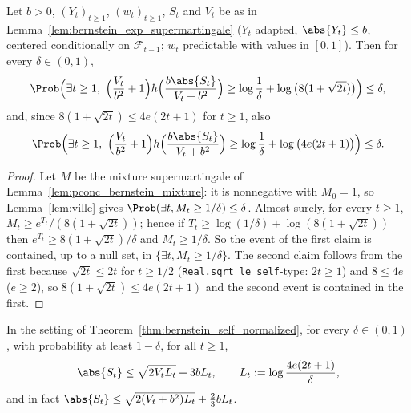 \begin{theorem}\label{thm:bernstein_self_normalized}
\leanok
Let $b > 0$, $(Y_t)_{t \ge 1}$, $(w_t)_{t \ge 1}$, $S_t$ and $V_t$ be as in
Lemma~\ref{lem:bernstein_exp_supermartingale} ($Y_t$ adapted, $\abs{Y_t} \le b$, centered
conditionally on $\mathcal F_{t-1}$; $w_t$ predictable with values in $[0, 1]$). Then for every
$\delta \in (0, 1)$,
\[
  \Prob\Big( \exists t \ge 1,\ \Big(\frac{V_t}{b^2} + 1\Big) h\Big(\frac{b\abs{S_t}}{V_t + b^2}\Big) \ge \log\frac1\delta + \log\big(8(1 + \sqrt{2t})\big) \Big) \le \delta ,
\]
and, since $8(1 + \sqrt{2t}) \le 4e(2t + 1)$ for $t \ge 1$, also
\[
  \Prob\Big( \exists t \ge 1,\ \Big(\frac{V_t}{b^2} + 1\Big) h\Big(\frac{b\abs{S_t}}{V_t + b^2}\Big) \ge \log\frac1\delta + \log\big(4e(2t + 1)\big) \Big) \le \delta .
\]
\end{theorem}

\begin{proof}
\leanok
Let $M$ be the mixture supermartingale of Lemma~\ref{lem:pconc_bernstein_mixture}: it is
nonnegative with $M_0 = 1$, so Lemma~\ref{lem:ville} gives $\Prob(\exists t, M_t \ge 1/\delta) \le \delta$.
Almost surely, for every $t \ge 1$, $M_t \ge e^{T_t}/(8(1 + \sqrt{2t}))$; hence if
$T_t \ge \log(1/\delta) + \log(8(1 + \sqrt{2t}))$ then $e^{T_t} \ge 8(1 + \sqrt{2t})/\delta$ and
$M_t \ge 1/\delta$. So the event of the first claim is contained, up to a null set, in
$\{\exists t, M_t \ge 1/\delta\}$. The second claim follows from the first because
$\sqrt{2t} \le 2t$ for $t \ge 1/2$ (\texttt{Real.sqrt\_le\_self}-type: $2t \ge 1$) and
$8 \le 4e$ ($e \ge 2$), so $8(1 + \sqrt{2t}) \le 4e(2t + 1)$ and the second event is contained in
the first.
\end{proof}

\begin{corollary}\label{cor:bernstein_explicit}
\leanok
In the setting of Theorem~\ref{thm:bernstein_self_normalized}, for every $\delta \in (0, 1)$,
with probability at least $1 - \delta$, for all $t \ge 1$,
\[
  \abs{S_t} \le \sqrt{2 V_t L_t} + 3 b L_t, \qquad L_t := \log\frac{4e(2t + 1)}{\delta} ,
\]
and in fact $\abs{S_t} \le \sqrt{2(V_t + b^2) L_t} + \frac23 b L_t$.
\end{corollary}

